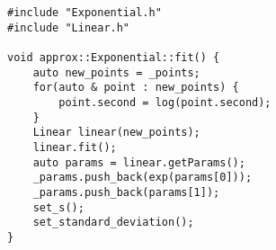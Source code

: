\begin{lstlisting}
#include "Exponential.h"
#include "Linear.h"

void approx::Exponential::fit() {
    auto new_points = _points;
    for(auto & point : new_points) {
        point.second = log(point.second);
    }
    Linear linear(new_points);
    linear.fit();
    auto params = linear.getParams();
    _params.push_back(exp(params[0]));
    _params.push_back(params[1]);
    set_s();
    set_standard_deviation();
}

\end{lstlisting}